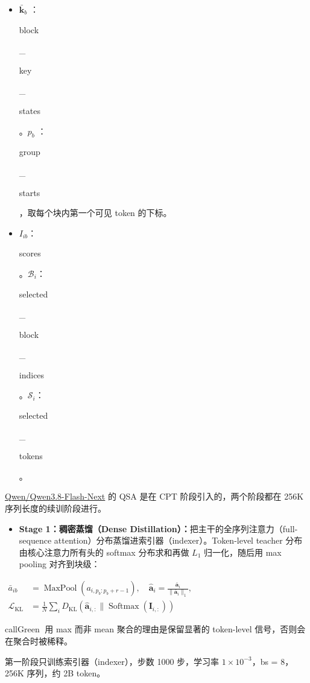 \documentclass[zihao=false,fontset=windows]{ctexart}
\newcommand{\bigmath}[1]{%
  \begin{center}\large$\displaystyle #1$\end{center}%
}
\begin{document}
\begin{feishuquote}
\begin{itemize}
\item $\bar{\mathbf k}_b$ ：{\setlength{\fboxsep}{0pt}\colorbox{inlinebg}{\strut\ttfamily block}\colorbox{inlinebg}{\strut\ttfamily \_}\allowbreak{}\colorbox{inlinebg}{\strut\ttfamily key}\colorbox{inlinebg}{\strut\ttfamily \_}\allowbreak{}\colorbox{inlinebg}{\strut\ttfamily states}}。$p_b$ ：{\setlength{\fboxsep}{0pt}\colorbox{inlinebg}{\strut\ttfamily group}\colorbox{inlinebg}{\strut\ttfamily \_}\allowbreak{}\colorbox{inlinebg}{\strut\ttfamily starts}}，取每个块内第一个可见 token 的下标。
\item $I_{ib}$：{\setlength{\fboxsep}{0pt}\colorbox{inlinebg}{\strut\ttfamily scores}}。$\mathcal B_i$：{\setlength{\fboxsep}{0pt}\colorbox{inlinebg}{\strut\ttfamily selected}\colorbox{inlinebg}{\strut\ttfamily \_}\allowbreak{}\colorbox{inlinebg}{\strut\ttfamily block}\colorbox{inlinebg}{\strut\ttfamily \_}\allowbreak{}\colorbox{inlinebg}{\strut\ttfamily indices}}。$\mathcal S_i$： {\setlength{\fboxsep}{0pt}\colorbox{inlinebg}{\strut\ttfamily selected}\colorbox{inlinebg}{\strut\ttfamily \_}\allowbreak{}\colorbox{inlinebg}{\strut\ttfamily tokens}}。
\end{itemize}
\end{feishuquote}

\par\vspace{0.75em}\par\vspace{0.28em}
\href{https://huggingface.co/Qwen/Qwen3.8-Flash-Next}{Qwen/Qwen3.8-Flash-Next} 的 QSA 是在 CPT 阶段引入的，两个阶段都在 256K 序列长度的续训阶段进行。

\begin{itemize}
\item \textcolor{feishuRed}{\textbf{Stage 1：稠密蒸馏（Dense Distillation）：}}把主干的全序列注意力（full-sequence attention）分布蒸馏进索引器（indexer）。Token-level teacher 分布由核心注意力所有头的 softmax 分布求和再做 $L_1$ 归一化，随后用 max pooling 对齐到块级：
\end{itemize}
\bigmath{\begin{aligned}\bar a_{ib}&=\operatorname{MaxPool}(a_{i,p_b:p_b+r-1}),\quad\hat{\mathbf a}_i=\frac{\bar{\mathbf a}_i}{\|\bar{\mathbf a}_i\|_1},\\\mathcal L_{\mathrm{KL}}&=\frac1N\sum_i D_{\mathrm{KL}}(\hat{\mathbf a}_{i,:}\|\operatorname{Softmax}(\mathbf I_{i,:}))\end{aligned}}
\begin{feishubox}{callGreen}{📎}
用 max 而非 mean 聚合的理由是保留显著的 token-level 信号，否则会在聚合时被稀释。

\end{feishubox}
第一阶段只训练索引器（indexer），步数 1000 步，学习率 $1\times10^{-3}$，bs = 8，256K 序列，约 2B token。
\end{document}
